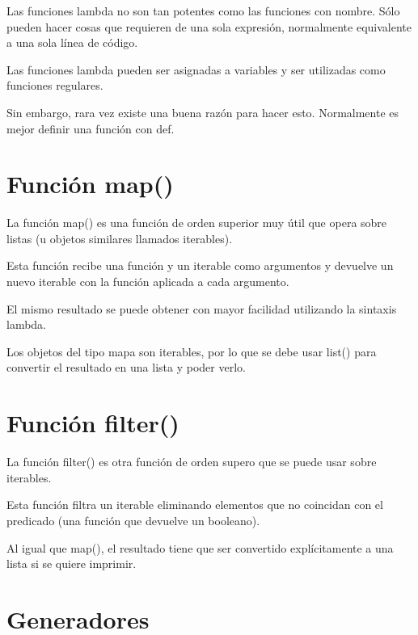 \documentclass{report}
\begin{document}
Las funciones lambda no son tan potentes como las funciones con nombre. Sólo pueden hacer cosas que requieren de una sola expresión, normalmente equivalente a una sola línea de código.


Las funciones lambda pueden ser asignadas a variables y ser utilizadas como funciones regulares.


Sin embargo, rara vez existe una buena razón para hacer esto. Normalmente es mejor definir una función con def.

\section{Función map()}

La función map() es una función de orden superior muy útil que opera sobre listas (u objetos similares llamados iterables).\smallskip

Esta función recibe una función y un iterable como argumentos y devuelve un nuevo iterable con la función aplicada a cada argumento.


El mismo resultado se puede obtener con mayor facilidad utilizando la sintaxis lambda.


Los objetos del tipo mapa son iterables, por lo que se debe usar list() para convertir el resultado en una lista y poder verlo.

\section{Función filter()}

La función filter() es otra función de orden supero que se puede usar sobre iterables.\smallskip

Esta función filtra un iterable eliminando elementos que no coincidan con el predicado (una función que devuelve un booleano).


Al igual que map(), el resultado tiene que ser convertido explícitamente a una lista si se quiere imprimir.

\section{Generadores}
\end{document}

